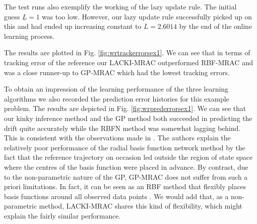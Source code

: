 \documentclass{article} %
\theoremstyle{definition}
\theoremstyle{remark}
\begin{document}
The test runs also exemplify the working of the lazy update rule.
The initial guess $\underline L=1$ was too low. However, our lazy update rule successfully picked up on this and had ended up increasing constant to $L=2.6014$ by the end of the online learning process.



%
%
\begin{figure*}
        \centering
   \caption{Tracking error comparison of first example.}
	 \label{fig:wrtrackerrorsex1}
\end{figure*}	   

The results are plotted in Fig. \ref{fig:wrtrackerrorsex1}. 
We can see that in terms of tracking error of the reference our LACKI-MRAC outperformed RBF-MRAC and was a close runner-up to GP-MRAC which had the lowest tracking errors.  

%
To obtain an impression of the learning performance of the three learning algorithms we also recorded the prediction error histories for this example problem. The results are depicted in Fig. \ref{fig:wrprederrorsex1}. We can see that our kinky inference method and the GP method both succeeded in predicting the drift quite accurately while the RBFN method was somewhat lagging behind.
This is consistent with the observations made in \cite{Chowdhary2013,ChowdharyCDC2013}. The authors explain the relatively poor performance of the radial basis function network method by the fact that the reference trajectory on occasion led outside the region of state space where the centres of the basis function were placed in advance. By contrast, due to the non-parametric nature of the GP, GP-MRAC does not suffer from such a priori limitations. In fact, it can be seen as an RBF method that flexibly places basis functions around all observed data points \cite{GPbook:2006}. We would add that, as a non-parametric method, LACKI-MRAC shares this kind of flexibility, which might explain the fairly similar performance. 
\end{document}
